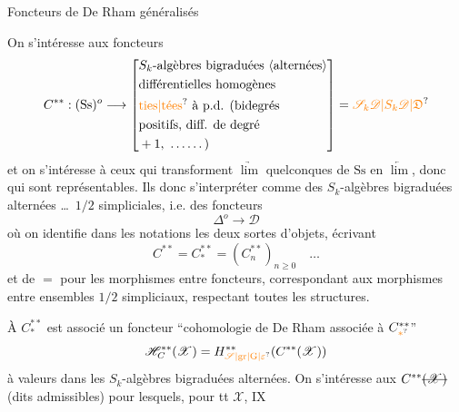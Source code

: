\begin{center}Foncteurs de De Rham généralisés\end{center}
On s'intéresse aux foncteurs
\[
 C^{**}:(\mathrm{Ss})^{o}\longrightarrow
 \left[\begin{aligned}
 &S_k\text{-algèbres bigraduées \inserted{alternées}}\\
 &\text{différentielles homogènes}\\
 &\text{\unsure{ties|tées} à p.d. (bidegrés}\\
 &\text{positifs, diff. de degré}\\
 &+1,\ \ldots\ldots\,)
 \end{aligned}\right]=\unsure{\mathscr S_k\mathscr D|S_k\mathscr D|\mathfrak D}
\]
et on s'intéresse à ceux qui transforment $\underrightarrow{\lim}$ quelconques de $\mathrm{Ss}$ en $\underleftarrow{\lim}$, donc qui sont représentables.
Ils   donc s'interpréter  comme des $S_k$-algèbres bigraduées alternées \ldots\ $1/2$ simpliciales, i.e. des foncteurs
\[
 \mathbb{\Delta}^{o}\longrightarrow\mathscr D
\]
où on identifie dans les notations les deux sortes d'objets, écrivant 
\[
 C^{**}=C_*^{**}=(C_n^{**})_{n\geq 0}\quad\ldots
\]
et de $=$ pour les morphismes entre foncteurs, correspondant aux morphismes entre ensembles $1/2$ simpliciaux, respectant toutes les structures.

À $C_*^{**}$ est associé un foncteur ``cohomologie de De Rham associée à $C_{\unsure{*}}^{**}$''
\[
 \mathscr H_C^{**}(\mathscr X)=H_{\unsure{\mathscr S|\mathrm{gr}|\mathrm{G}|\varepsilon}}^{**}(C^{**}(\mathscr X))
\]
à valeurs dans les $S_k$-algèbres bigraduées alternées. On s'intéresse aux $C^{**}\deleted{(\mathscr X)}$ (dits admissibles) pour lesquels, pour tt $\mathscr X$,
\hfill IX

